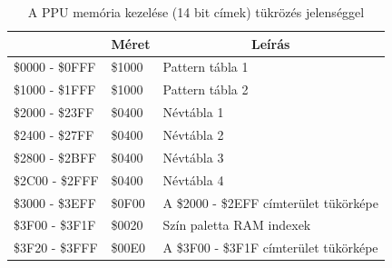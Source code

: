 	\begin{table}[H]
		\footnotesize
		\centering
		\begin{tabular}{|l|l|l|}
			\hline
			\rowcolor[HTML]{C0C0C0} 
			\multicolumn{1}{|c|}{\cellcolor[HTML]{C0C0C0}\textbf{Memórai címek}} & \multicolumn{1}{c|}{\cellcolor[HTML]{C0C0C0}\textbf{Méret}} & \multicolumn{1}{c|}{\cellcolor[HTML]{C0C0C0}\textbf{Leírás}} \\ \hline
			\$0000 - \$0FFF                                                        & \$1000                                                      & Pattern tábla 1                                              \\ \hline
			\$1000 - \$1FFF                                                        & \$1000                                                      & Pattern tábla 2                                              \\ \hline
			\$2000 - \$23FF                                                        & \$0400                                                      & Névtábla 1                                                  \\ \hline
			\$2400 - \$27FF                                                        & \$0400                                                      & Névtábla 2                                                  \\ \hline
			\$2800 - \$2BFF                                                        & \$0400                                                      & Névtábla 3                                                  \\ \hline
			\$2C00 - \$2FFF                                                        & \$0400                                                      & Névtábla 4                                                  \\ \hline
			\$3000 - \$3EFF                                                        & \$0F00                                                      & A \$2000 - \$2EFF címterület tükörképe                         \\ \hline
			\$3F00 - \$3F1F                                                        & \$0020                                                      & Szín paletta RAM indexek                                     \\ \hline
			\$3F20 - \$3FFF                                                        & \$00E0                                                      & A \$3F00 - \$3F1F címterület tükörképe                         \\ \hline
		\end{tabular}
		\caption{A PPU memória kezelése (14 bit címek) tükrözés jelenséggel}
		\label{tab:PPU-memory}
	\end{table}
	
